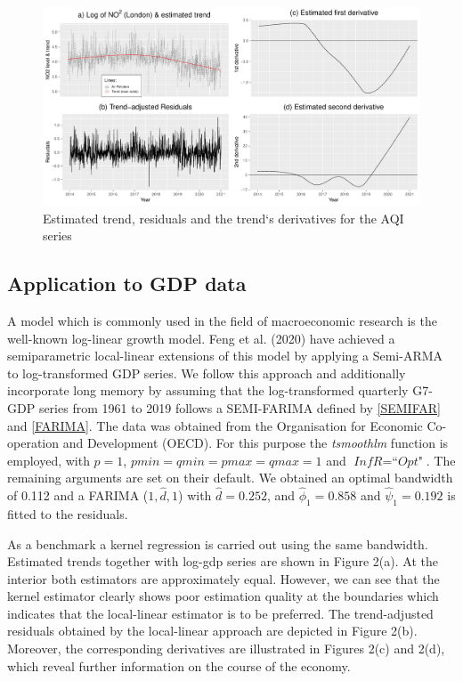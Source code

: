 \documentclass[12pt]{article}
\begin{document}
 

\begin{figure}[!h]
	\label{aqi}
	\includegraphics[trim = {0cm 0mm 0mm 0mm}, width = \textwidth]{Abb/London_AirQuality_AQI_linear.pdf}
	\caption{Estimated trend, residuals and the trend`s derivatives for the AQI series}
\end{figure}

\subsection{Application to GDP data}
A model which is commonly used in the field of macroeconomic research is the well-known log-linear growth model. Feng et al. (2020) have achieved a semiparametric local-linear extensions of this model by applying a Semi-ARMA to log-transformed GDP series. We follow this approach and additionally incorporate long memory by assuming that the log-transformed quarterly G7-GDP series from 1961 to 2019 follows a SEMI-FARIMA defined by \eqref{SEMIFAR} and \eqref{FARIMA}. The data was obtained from the Organisation for Economic Co-operation and Development (OECD). For this purpose the \textit{tsmoothlm} function is employed, with $\textit{p} = 1$, $\textit{pmin} = \textit{qmin} = \textit{pmax} = \textit{qmax} = 1$ and $\textit{InfR} = \textit{``Opt"}$. The remaining arguments are set on their default. We obtained an optimal bandwidth of 0.112 and a FARIMA ($1,\hat{d},1$) with $\hat{d} = 0.252$, and $\hat{\phi}_1 = 0.858$ and $\hat{\psi}_1 = 0.192$ is fitted to the residuals.

As a benchmark a kernel regression is carried out using the same bandwidth. Estimated trends together with log-gdp series are shown in Figure 2(a). At the interior both estimators are approximately equal. However, we can see that the kernel estimator clearly shows poor estimation quality at the boundaries which indicates that the local-linear estimator is to be preferred. The trend-adjusted residuals obtained by the local-linear approach are depicted in Figure 2(b). Moreover, the corresponding derivatives are illustrated in Figures 2(c) and 2(d), which reveal further information on the course of the economy.
 
\end{document}
